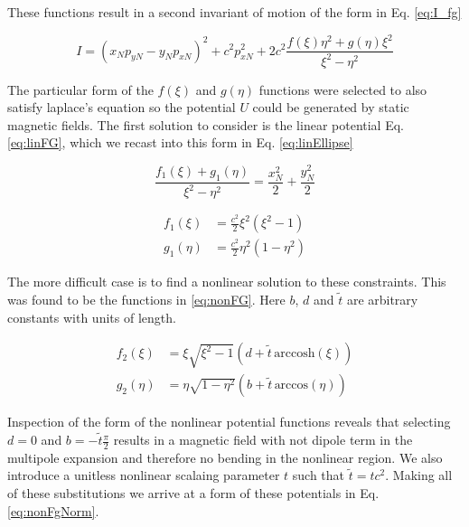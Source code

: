 These functions result in a second invariant of motion of the form in Eq. \ref{eq:I_fg}

\begin{equation} \label{eq:I_fg}
	I = (x_N p_{yN} - y_N p_{xN})^2 + c^2 p_{xN}^2 + 2c^2 \frac{f(\xi)\eta^2 + g(\eta)\xi^2}{\xi^2 - \eta^2}
\end{equation}

The particular form of the $f(\xi)$ and $g(\eta)$ functions were selected to also satisfy laplace's equation so the potential $U$ could be generated by static magnetic fields. The first solution to consider is the linear potential Eq. \ref{eq:linFG}, which we recast into this form in Eq. \ref{eq:linEllipse}

\begin{equation} \label{eq:linFG}
	\frac{f_1(\xi) + g_1(\eta)}{\xi^2 - \eta^2} = \frac{x_N^2}{2} + \frac{y_N^2}{2}
\end{equation}

\begin{equation} \label{eq:linEllipse}
\begin{split}
	f_1(\xi) &= \frac{c^2}{2}\xi^2(\xi^2-1)\\
	g_1(\eta) &= \frac{c^2}{2}\eta^2(1 - \eta^2)
\end{split}
\end{equation}

The more difficult case is to find a nonlinear solution to these constraints. This was found to be the functions in \ref{eq:nonFG}. Here $b$, $d$ and $\tilde{t}$ are arbitrary constants with units of length.

\begin{equation} \label{eq:nonFG}
\begin{split}
	f_2(\xi) &= \xi \sqrt{\xi^2 -1}(d + \tilde{t} \hspace{2pt} \textrm{arccosh}(\xi)) \\
	g_2(\eta) &= \eta \sqrt{1-\eta^2}(b + \tilde{t} \hspace{2pt} \textrm{arccos}(\eta))
\end{split}
\end{equation}

Inspection of the form of the nonlinear potential functions reveals that selecting $d=0$ and $b=-\tilde{t}\frac{\pi}{2}$ results in a magnetic field with not dipole term in the multipole expansion and therefore no bending in the nonlinear region. We also introduce a unitless nonlinear scalaing parameter $t$ such that $\tilde{t} = tc^2$. Making all of these substitutions we arrive at a form of these potentials in Eq. \ref{eq:nonFgNorm}.

